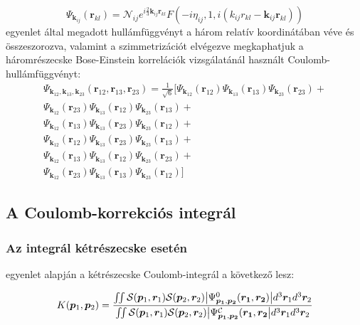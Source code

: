\documentclass[11pt,a4paper]{article}
\numberwithin{equation}{subsection}
\numberwithin{figure}{section}
\begin{document}
\begin{equation}
\Psi_{\bm{k}_{ij}}(\bm{r}_{kl}) = \mathcal{N}_{ij}e^{i\frac{2}{3}\bm{k}_{ij}\bm{r}_{kl}}F(-i\eta_{ij},1,i(k_{ij}r_{kl}-\bm{k}_{ij}\bm{r}_{kl}))
\label{eq:Psikij}
\end{equation}
 egyenlet által megadott hullámfüggvényt a három relatív koordinátában véve és összeszorozva, valamint a szimmetrizációt elvégezve megkaphatjuk a háromrészecske Bose-Einstein korrelációk vizsgálatánál használt Coulomb-hullámfüggvényt:
\begin{equation}
\begin{aligned}
\Psi_{\bm{k}_{12}, \bm{k}_{13}, \bm{k}_{23}}(\bm{r}_{12},\bm{r}_{13},\bm{r}_{23})  = \frac{1}{\sqrt{6}}\Bigg[
\Psi_{\bm{k}_{12}}(\bm{r}_{12})\Psi_{\bm{k}_{13}}(\bm{r}_{13})\Psi_{\bm{k}_{23}}(\bm{r}_{23})+\\
\Psi_{\bm{k}_{12}}(\bm{r}_{23})\Psi_{\bm{k}_{13}}(\bm{r}_{12})\Psi_{\bm{k}_{23}}(\bm{r}_{13})+\\ 
\Psi_{\bm{k}_{12}}(\bm{r}_{13})\Psi_{\bm{k}_{13}}(\bm{r}_{23})\Psi_{\bm{k}_{23}}(\bm{r}_{12})+\\
\Psi_{\bm{k}_{12}}(\bm{r}_{12})\Psi_{\bm{k}_{13}}(\bm{r}_{23})\Psi_{\bm{k}_{23}}(\bm{r}_{13})+\\
\Psi_{\bm{k}_{12}}(\bm{r}_{13})\Psi_{\bm{k}_{13}}(\bm{r}_{12})\Psi_{\bm{k}_{23}}(\bm{r}_{23})+\\
\Psi_{\bm{k}_{12}}(\bm{r}_{23})\Psi_{\bm{k}_{13}}(\bm{r}_{13})\Psi_{\bm{k}_{23}}(\bm{r}_{12})
\Bigg]
\end{aligned}
\end{equation}


\subsection{A Coulomb-korrekciós integrál}

\subsubsection{Az integrál kétrészecske esetén}
 egyenlet alapján a kétrészecske Coulomb-integrál a következő lesz:

\begin{equation}
K(\bm{p}_1,\bm{p}_2)=
\frac{
\iint \mathcal{S}(\bm{p}_1, \bm{r}_1)\mathcal{S}(\bm{p}_2, \bm{r}_2)
\abs{\Psi^{0}_{\bm{p_1},\bm{p_2}}(\bm{r_1},\bm{r_2})} d^3 \bm{r}_1d^3 \bm{r}_2
}{\iint \mathcal{S}(\bm{p}_1, \bm{r}_1)\mathcal{S}(\bm{p}_2, \bm{r}_2)
\abs{\Psi^\mathcal{C}_{\bm{p_1},\bm{p_2}}(\bm{r_1},\bm{r_2}}d^3 \bm{r}_1d^3 \bm{r}_2}
\label{eq:Kn2}
\end{equation}
\end{document}
